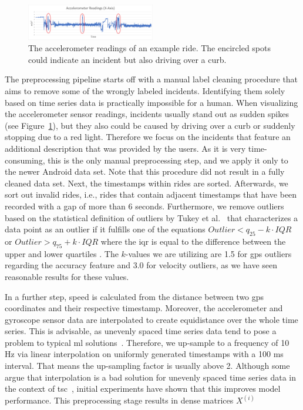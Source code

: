 \begin{figure}[t]
	\centering
	\includegraphics[width=0.5\textwidth]{fig/accelerometer-x-axis.png}
	\caption{The accelerometer readings of an example ride. The encircled spots could indicate an incident but also driving over a curb.}
	\label{fig:x-axis}
\end{figure}

The preprocessing pipeline starts off with a manual label cleaning procedure that aims to remove some of the wrongly labeled incidents.
Identifying them solely based on time series data is practically impossible for a human.
When visualizing the accelerometer sensor readings, incidents usually stand out as sudden spikes (see Figure~\ref{fig:x-axis}), but they also could be caused by driving over a curb or suddenly stopping due to a red light.
Therefore we focus on the incidents that feature an additional description that was provided by the users.
As it is very time-consuming, this is the only manual preprocessing step, and we apply it only to the newer Android data set.
Note that this procedure did not result in a fully cleaned data set.
Next, the timestamps within rides are sorted.
Afterwards, we sort out invalid rides, i.e., rides that contain adjacent timestamps that have been recorded with a gap of more than 6 seconds.
Furthermore, we remove outliers based on the statistical definition of outliers by Tukey et al.~\cite{tukey1977exploratory} that characterizes a data point as an outlier if it fulfills one of the equations $Outlier < q_{25} - k \cdot IQR$ or $Outlier > q_{75} + k \cdot IQR$ where the \ac{iqr} is equal to the difference between the upper and lower quartiles \cite{upton1996understanding, zwillinger1999crc}.
The $k$-values we are utilizing are 1.5 for \ac{gps} outliers regarding the accuracy feature and 3.0 for velocity outliers, as we have seen reasonable results for these values.

In a further step, speed is calculated from the distance between two \ac{gps} coordinates and their respective timestamp.
Moreover, the accelerometer and gyroscope sensor data are interpolated to create equidistance over the whole time series.
This is advisable, as unevenly spaced time series data tend to pose a problem to typical \ac{ml} solutions~\cite{weerakody2021review}.
Therefore, we up-sample to a frequency of 10 Hz via linear interpolation on uniformly generated timestamps with a 100 ms interval.
That means the up-sampling factor is usually above 2.
Although some argue that interpolation is a bad solution for unevenly spaced time series data in the context of \ac{tsc}~\cite{hayashi2005covariance, eckner2012framework}, initial experiments have shown that this improves model performance.
This preprocessing stage results in dense matrices $X^{(i)}$

